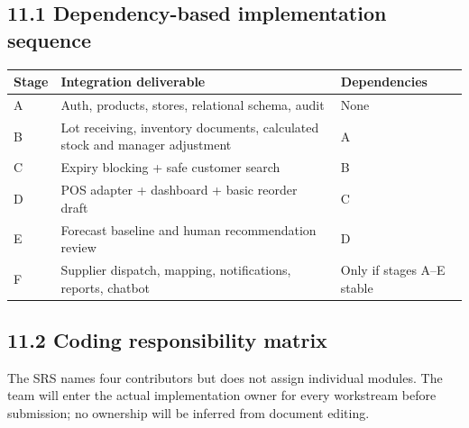 \subsection{11.1 Dependency-based implementation sequence}\label{dependency-based-implementation-sequence}

{\def\LTcaptype{none} %
\begin{longtable}[]{|
  >{\raggedright\arraybackslash}m{}|
  >{\raggedright\arraybackslash}m{}|
  >{\raggedright\arraybackslash}m{}|}
\hline
\begin{minipage}[c]{\linewidth}\raggedright
\textbf{Stage}
\end{minipage} & \begin{minipage}[c]{\linewidth}\raggedright
\textbf{Integration deliverable}
\end{minipage} & \begin{minipage}[c]{\linewidth}\raggedright
\textbf{Dependencies}
\end{minipage} \\
\hline
\endhead

\endlastfoot
A & Auth, products, stores, relational schema, audit & None \\ \hline
B & Lot receiving, inventory documents, calculated stock and manager adjustment & A \\ \hline
C & Expiry blocking + safe customer search & B \\ \hline
D & POS adapter + dashboard + basic reorder draft & C \\ \hline
E & Forecast baseline and human recommendation review & D \\ \hline
F & Supplier dispatch, mapping, notifications, reports, chatbot & Only if stages A--E stable \\ \hline
\end{longtable}
}

\subsection{11.2 Coding responsibility matrix}\label{coding-responsibility-matrix}

The SRS names four contributors but does not assign individual modules. The team will enter the actual implementation owner for every workstream before submission; no ownership will be inferred from document editing.

